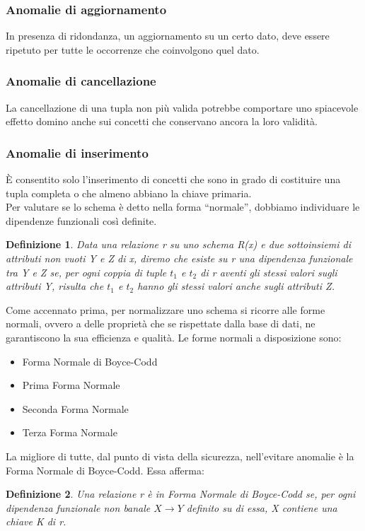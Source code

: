 \documentclass[a4paper, 10pt]{report}
\begin{document}
\subsubsection{Anomalie di aggiornamento}
In presenza di ridondanza, un aggiornamento su un certo dato, deve essere ripetuto per tutte le occorrenze che coinvolgono quel dato.
\subsubsection{Anomalie di cancellazione}
La cancellazione di una tupla non pi\`u valida potrebbe comportare uno spiacevole effetto domino anche sui concetti che conservano ancora la loro validit\`a.
\subsubsection{Anomalie di inserimento}
\`E consentito solo l'inserimento di concetti che sono in grado di costituire una tupla completa o che almeno abbiano la chiave primaria.\\
Per valutare se lo schema \`e detto nella forma ``normale'', dobbiamo individuare le dipendenze funzionali cos\`i definite.
\newtheorem{mydef}{Definizione}
\begin{mydef}
Data una relazione r su uno schema R(x) e due sottoinsiemi di attributi non vuoti Y e Z di x, diremo che esiste su r una dipendenza funzionale tra Y e Z se, per ogni coppia di tuple $t_1$ e $t_2$ di r aventi gli stessi valori sugli attributi Y, risulta che $t_1$ e $t_2$ hanno gli stessi valori anche sugli attributi Z.
\end{mydef}

Come accennato prima, per normalizzare uno schema si ricorre alle forme normali, ovvero a delle propriet\`a che se rispettate dalla base di dati, ne garantiscono la sua efficienza e qualit\`a. Le forme normali a disposizione sono:
\begin{itemize}
\item Forma Normale di Boyce-Codd
\item Prima Forma Normale
\item Seconda Forma Normale
\item Terza Forma Normale
\end{itemize}
La migliore di tutte, dal punto di vista della sicurezza, nell'evitare anomalie \`e la Forma Normale di Boyce-Codd. Essa afferma:
\begin{mydef}
Una relazione r \`e in Forma Normale di Boyce-Codd se, per ogni dipendenza funzionale non banale $X \rightarrow Y$ definito su di essa, X contiene una chiave K di r. 
\end{mydef}
\end{document}
